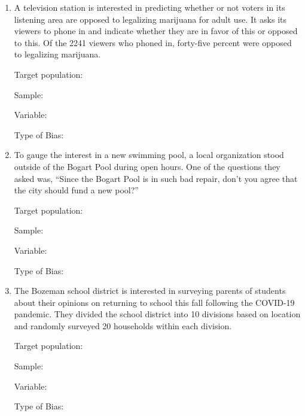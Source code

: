 \documentclass[
]{report}
\begin{document}
\newpage

\begin{enumerate}
\def\labelenumi{\arabic{enumi}.}
\setcounter{enumi}{2}
\item
  A television station is interested in predicting whether or not voters in its listening area are opposed to legalizing marijuana for adult use. It asks its viewers to phone in and indicate whether they are in favor of this or opposed to this. Of the 2241 viewers who phoned in, forty-five percent were opposed to legalizing marijuana.
  \vspace{0.1in}

  Target population:
  \vspace{0.3in}

  Sample:
  \vspace{0.3in}

  Variable:
  \vspace{0.3in}

  Type of Bias:
  \vspace{0.3in}
\item
  To gauge the interest in a new swimming pool, a local organization stood outside of the Bogart Pool during open hours. One of the questions they asked was, ``Since the Bogart Pool is in such bad repair, don't you agree that the city should fund a new pool?''
  \vspace{0.1in}

  Target population:
  \vspace{0.3in}

  Sample:
  \vspace{0.3in}

  Variable:
  \vspace{0.3in}

  Type of Bias:
  \vspace{0.3in}
\item
  The Bozeman school district is interested in surveying parents of students about their opinions on returning to school this fall following the COVID-19 pandemic. They divided the school district into 10 divisions based on location and randomly surveyed 20 households within each division.
  \vspace{0.1in}

  Target population:
  \vspace{0.3in}

  Sample:
  \vspace{0.3in}

  Variable:
  \vspace{0.3in}

  Type of Bias:
  \vspace{0.3in}
\end{enumerate}
\end{document}
